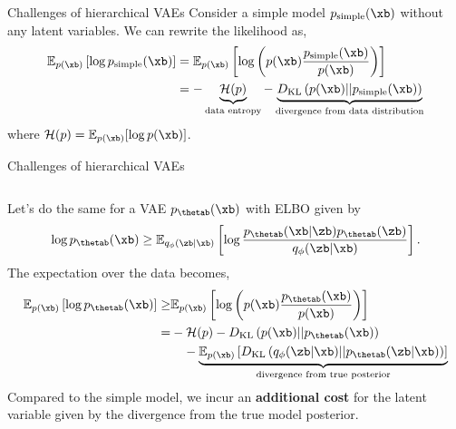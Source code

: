 \begin{frame}{Challenges of hierarchical VAEs}
    Consider a simple model $p_{\text{simple}}(\xb)$ without any latent variables. We can rewrite the likelihood as,
    \begin{align*}
        \mathbb{E}_{p(\xb)} \left[ \log p_{\text{simple}}(\xb) \right] &= \mathbb{E}_{p(\xb)} \left[ \log \left( p(\xb) \frac{p_{\text{simple}}(\xb)}{p(\xb)} \right) \right] \\
                                                                    &= -\underbrace{\mathcal{H}(p)}_{\text{data entropy}} - \underbrace{D_\text{KL} \left( p(\xb) || p_\text{simple}(\xb) \right)}_{\text{divergence from data distribution}}
    \end{align*}
    where $\mathcal{H}(p)=\mathbb{E}_{p(\xb)}[\log p(\xb)]$.
\end{frame}


\begin{frame}{Challenges of hierarchical VAEs}
    \begin{columns}
        \begin{column}{1\textwidth}
            Let's do the same for a VAE $p_\thetab(\xb)$ with ELBO given by
            \begin{equation}
                \log p_\thetab(\xb) \geq \mathbb{E}_{q_\phi(\zb|\xb)} \left[ \log \frac{p_\thetab(\xb|\zb)p_\thetab(\zb)}{q_\phi(\zb|\xb)} \right].
            \end{equation}
            The expectation over the data becomes,
            \begin{align}
                \mathbb{E}_{p(\xb)} \left[ \log p_\thetab(\xb) \right] \geq& \mathbb{E}_{p(\xb)} \left[ \log \left( p(\xb) \frac{p_\thetab(\xb)}{p(\xb)} \right) \right] \notag \\
                                                                    =& -\mathcal{H}(p) - D_\text{KL} \left( p(\xb) || p_\thetab(\xb) \right) \notag \\
                                                                        & \quad - \underbrace{\mathbb{E}_{p(\xb)} \left[ D_\text{KL}\left( q_\phi(\zb|\xb) || p_\thetab(\zb|\xb) \right) \right]}_{\text{divergence from true posterior}}
            \end{align}
            Compared to the simple model, we incur an \textbf{additional cost} for the latent variable given by the divergence from the true model posterior.
        \end{column}
    \end{columns}
\end{frame}


